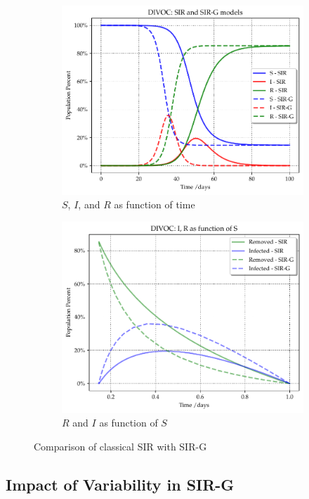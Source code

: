 \documentclass[USenglish,10pt]{article}
\begin{document}
\begin{figure}
	\centering
	\begin{subfigure}{.45\textwidth}
		\includegraphics[width=.8\linewidth]{DIVOC-SIR-comp.pdf}
		\caption{$S$, $I$, and $R$ as function of time}
	\end{subfigure}
	\begin{subfigure}{.45\textwidth}
		\includegraphics[width=.8\linewidth]{DIVOC-IR-comp.pdf}
		\caption{$R$ and $I$ as function of $S$}
	\end{subfigure}
	\caption{Comparison of classical SIR with SIR-G}
	\label{fig:comp}
\end{figure}


\subsection{Impact of Variability in SIR-G}
\end{document}
